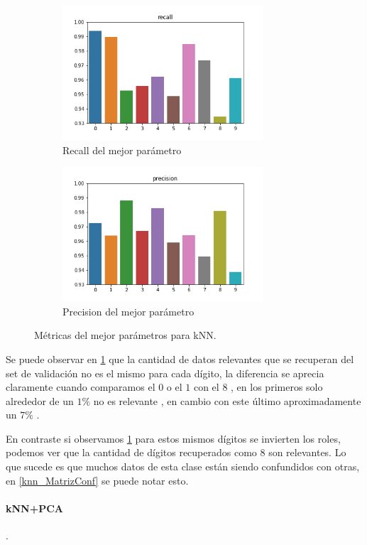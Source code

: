 \begin{figure}[H]
\begin{subfigure}{0.5\textwidth}
\includegraphics[width=0.9\linewidth, height=5cm]{images/recall_knn.png} 
\caption{Recall del mejor parámetro}
\label{knn_métricas1}%
\end{subfigure}
\begin{subfigure}{0.5\textwidth}
\includegraphics[width=0.9\linewidth, height=5cm]{images/precision_knn.png} 
\caption{Precision del mejor parámetro}
\label{knn_métricas2}%
\end{subfigure}
\caption{Métricas del mejor parámetros para kNN.}
\label{knn_métricas}%
\end{figure}


Se puede observar en \ref{knn_métricas1} que la cantidad de datos relevantes que se recuperan del set de validación no es el mismo para cada dígito, la diferencia se aprecia claramente cuando comparamos el $0$ o el $1$ con el $8$ , en los primeros solo alrededor de un $1\%$ no es relevante , en cambio con este último aproximadamente un  $7\%$ .

En contraste si observamos \ref{knn_métricas1} para estos mismos dígitos se invierten los roles, podemos ver que la cantidad de dígitos recuperados como $8$ son relevantes.
Lo que sucede es que muchos datos de esta clase están siendo confundidos con otras, en \ref{knn_MatrizConf} se puede notar esto.
\paragraph{kNN+PCA}.


